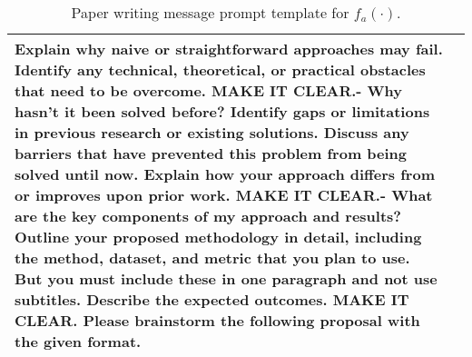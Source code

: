 \begin{table*}[ht]
\begin{tabular}{p{1cm}p{11.5cm}}
Explain why naive or straightforward approaches may fail.\newline
Identify any technical, theoretical, or practical obstacles that need to be overcome.\newline
MAKE IT CLEAR.\newline
[Question 4] - Why hasn't it been solved before?\newline
Identify gaps or limitations in previous research or existing solutions.\newline
Discuss any barriers that have prevented this problem from being solved until now.\newline
Explain how your approach differs from or improves upon prior work.\newline
MAKE IT CLEAR.\newline
[Question 5] - What are the key components of my approach and results?\newline
Outline your proposed methodology in detail, including the method, dataset, and metric that you plan to use. But you must include these in one paragraph and not use subtitles.\newline
Describe the expected outcomes.\newline
MAKE IT CLEAR.\newline
Please brainstorm the following proposal with the given format.
 \\
\bottomrule[1.5pt]
\end{tabular}
\caption{Paper writing message prompt template for $f_a(\cdot)$.}
\label{tab:Paper_Writing_Prompt}
\end{table*}

